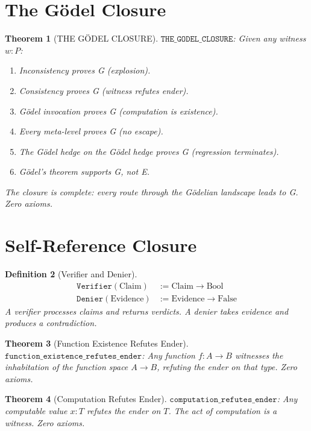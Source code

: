 \documentclass[12pt,a4paper]{article}
\newtheorem{theorem}{Theorem}[section]
\newtheorem{definition}[theorem]{Definition}
\begin{document}
\section{The G\"odel Closure}

\begin{theorem}[THE G\"ODEL CLOSURE]\label{thm:closure}
$\texttt{THE\_GODEL\_CLOSURE}$: Given any witness $w : P$:
\begin{enumerate}
    \item Inconsistency proves G (explosion).
    \item Consistency proves G (witness refutes ender).
    \item G\"odel invocation proves G (computation is existence).
    \item Every meta-level proves G (no escape).
    \item The G\"odel hedge on the G\"odel hedge proves G (regression terminates).
    \item G\"odel's theorem supports G, not E.
\end{enumerate}
The closure is complete: every route through the G\"odelian landscape
leads to G. Zero axioms.
\end{theorem}

\section{Self-Reference Closure}

\begin{definition}[Verifier and Denier]
\begin{align*}
\texttt{Verifier}(\text{Claim}) &:= \text{Claim} \to \text{Bool} \\
\texttt{Denier}(\text{Evidence}) &:= \text{Evidence} \to \text{False}
\end{align*}
A verifier processes claims and returns verdicts. A denier takes evidence
and produces a contradiction.
\end{definition}

\begin{theorem}[Function Existence Refutes Ender]\label{thm:func}
$\texttt{function\_existence\_refutes\_ender}$: Any function $f : A \to B$
witnesses the inhabitation of the function space $A \to B$, refuting the
ender on that type. Zero axioms.
\end{theorem}

\begin{theorem}[Computation Refutes Ender]\label{thm:compute}
$\texttt{computation\_refutes\_ender}$: Any computable value $x : T$
refutes the ender on $T$. The act of computation is a witness.
Zero axioms.
\end{theorem}
\end{document}

